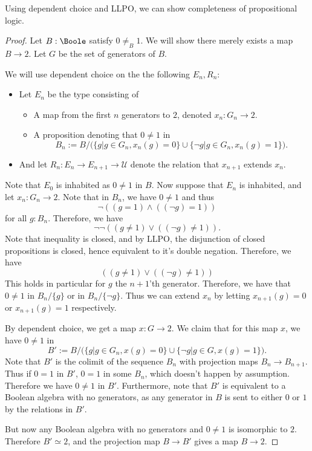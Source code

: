 \begin{lemma}\label{LLPOAndDCToCompleteness}
Using dependent choice and LLPO, we can show completeness of propositional logic. 
\end{lemma}
\begin{proof}
  Let $B:\Boole$ satisfy $0\neq_B 1$. We will show there merely exists a map $B\to 2$. 
  Let $G$ be the set of generators of $B$. 
  
  We will use dependent choice on the the following $E_n,R_n$:
  \begin{itemize}
    \item 
  Let $E_n$ be the type consisting of 
  \begin{itemize}
    \item A map from the first $n$ generators to $2$, denoted $x_n:G_n \to 2$. 
    \item A proposition denoting that $0\neq 1$ in 
      \begin{equation}
        B_n := B/\big( \{g|g\in G_n, x_n(g) = 0\} \cup \{ \neg g| g\in G_n, x_n(g) = 1\}\big).
      \end{equation}
  \end{itemize}
  \item 
    And let $R_n:E_n \to E_{n+1} \to \mathcal U$ denote the relation that $x_{n+1}$ extends $x_n$. 
  \end{itemize} 
  Note that $E_0$ is inhabited as $0\neq 1$ in $B$. 
  Now suppose that $E_n$ is inhabited,  and let $x_n:G_n \to 2$. 
  Note that in $B_n$, we have $0\neq 1$ and thus $$\neg ((g =1)  \wedge ((\neg g) = 1))$$
  for all $g:B_n$.
  Therefore, we have $$\neg \neg (( g\neq 1) \vee ((\neg g) \neq 1)).$$
  Note that inequality is closed, and by LLPO, the disjunction of closed propositions is closed, 
  hence equivalent to it's double negation. 
  Therefore, we have $$(( g\neq 1) \vee ((\neg g) \neq 1))$$
  This holds in particular for $g$ the $n+1$'th generator. 
  Therefore, we have that $0\neq 1$ in $B_n/\{g\}$ or in $B_n/\{\neg g\}$. 
  Thus we can extend $x_n$ by letting $x_{n+1}(g) = 0$ or $x_{n+1}(g) = 1$ respectively. 
  
  By dependent choice, we get a map $x:G\to 2$. 
  We claim that for this map $x$, we have $0\neq 1$ in 
  \begin{equation}
    B' := B/\big( \{g|g\in G_n, x(g) = 0\} \cup \{ \neg g| g\in G, x(g) = 1\}\big).
  \end{equation}
  Note that $B'$ is the colimit of the sequence $B_n$ with projection maps $B_n \to B_{n+1}$. 
  Thus if $0=1$ in $B'$, $0=1$ in some $B_n$, which doesn't happen by assumption. 
  Therefore we have $0\neq 1$ in $B'$. 
  Furthermore, note that $B'$ is equivalent to a Boolean algebra with no generators, 
  as any generator in $B$ is sent to either $0$ or $1$ by the relations in $B'$. 

  But now any Boolean algebra with no generators and $0\neq 1$ is isomorphic to $2$. 
  Therefore $B'\simeq 2$, and the projection map $B\to B'$ gives a map $B \to 2$. 
  



\end{proof}
